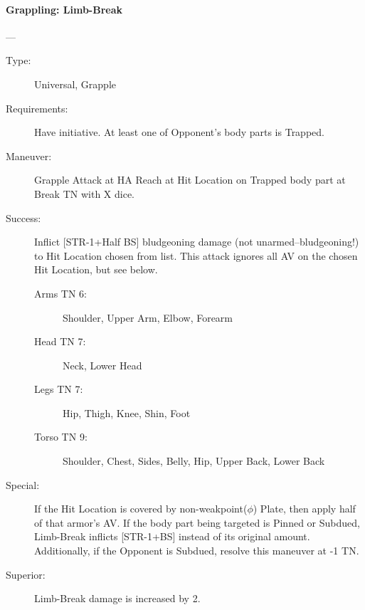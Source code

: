 \paragraph{Grappling: Limb-Break \large} \label{man:grappling-limb-break}
---\quad {\large [X]}
\vspace{-10pt} \begin{description}
\item [Type:] Universal, Grapple
\item [Requirements:] Have initiative. At least one of Opponent's body parts is Trapped.
\item [Maneuver:] Grapple Attack at HA Reach at Hit Location on Trapped body
  part at Break TN with X dice. 
\item [Success:] Inflict [STR-1+Half BS] bludgeoning damage (not
  unarmed--bludgeoning!) to Hit Location chosen from list. This attack ignores
  all AV on the chosen Hit Location, but see below. 
  \begin{description}
  \item [Arms TN 6:] Shoulder, Upper Arm, Elbow, Forearm
  \item [Head TN 7:] Neck, Lower Head
  \item [Legs TN 7:] Hip, Thigh, Knee, Shin, Foot
  \item [Torso TN 9:] Shoulder, Chest, Sides, Belly, Hip, Upper Back, Lower Back
  \end{description}
\item [Special:] 
 If the Hit Location is covered by non-weakpoint($\phi$) Plate, then apply half of
 that armor’s AV. 
If the body part being targeted is Pinned or Subdued, Limb-Break inflicts
[STR-1+BS] instead of its original amount. Additionally, if the Opponent is
Subdued, resolve this maneuver at -1 TN. 
\item [ Superior: ] Limb-Break damage is increased by 2.
\end{description}

